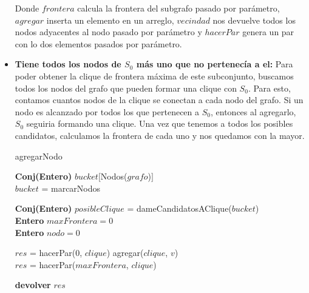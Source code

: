 \begin{itemize}
Donde $frontera$ calcula la frontera del subgrafo pasado por parámetro, $agregar$ inserta un elemento en un arreglo, $vecindad$ nos devuelve todos los nodos adyacentes al nodo pasado por parámetro y $hacerPar$ genera un par con lo dos elementos pasados por parámetro. \newline


\item \textbf{Tiene todos los nodos de $S_{0}$ más uno que no pertenecía a el:} \newline
Para poder obtener la clique de frontera máxima de este subconjunto, buscamos todos los nodos del grafo que pueden formar una clique con $S_{0}$. Para esto, contamos cuantos nodos de la clique se conectan a cada nodo del grafo. Si un nodo es alcanzado por todos los que pertenecen a $S_{0}$, entonces al agregarlo, $S_{0}$ seguiria formando una clique. Una vez que tenemos a todos los posibles candidatos, calculamos la frontera de cada uno y nos quedamos con la mayor. \newline

\begin{algorithm}[H]
    \SetAlgoLined
    \caption{agregarNodo}
	
    \textbf{Conj(Entero)} $bucket[$Nodos($grafo$)$]$  \\
	
    $bucket$ = marcarNodos
	
    \textbf{Conj(Entero)} $posibleClique$ = dameCandidatosAClique($bucket$)\\
   
    \textbf{Entero} $maxFrontera = 0$ \\
    \textbf{Entero} $nodo = 0$ \\



	{$res$ = hacerPar(0, $clique$)}
    {	agregar($clique$, $v$) \\
	$res$ = hacerPar($maxFrontera$, $clique$) }

    \textbf{devolver} $res$ \\
\end{algorithm}


\end{itemize}
